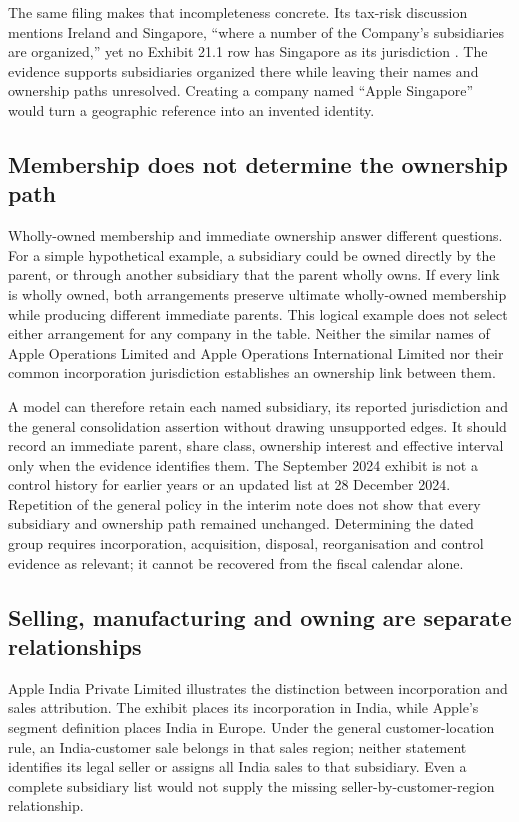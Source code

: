The same filing makes that incompleteness concrete. Its tax-risk discussion
mentions Ireland and Singapore, ``where a number of the Company's subsidiaries
are organized,'' yet no Exhibit 21.1 row has Singapore as its jurisdiction
\citep[Risk Factors, printed p.~16]{apple2024}. The evidence supports
subsidiaries organized there while leaving their names and ownership paths
unresolved. Creating a company named ``Apple Singapore'' would turn a
geographic reference into an invented identity.

\subsection{Membership does not determine the ownership path}

Wholly-owned membership and immediate ownership answer different questions.
For a simple hypothetical example, a subsidiary could be owned directly by
the parent, or through another subsidiary that the parent wholly owns. If
every link is wholly owned, both arrangements preserve ultimate wholly-owned
membership while producing different immediate parents. This logical example
does not select either arrangement for any company in the table. Neither the
similar names of Apple Operations Limited and Apple Operations International
Limited nor their common incorporation jurisdiction establishes an ownership
link between them.

A model can therefore retain each named subsidiary, its reported jurisdiction
and the general consolidation assertion without drawing unsupported edges.
It should record an immediate parent, share class, ownership interest and
effective interval only when the evidence identifies them. The September 2024
exhibit is not a control history for earlier years or an updated list at
28 December 2024. Repetition of the general policy in the interim note does
not show that every subsidiary and ownership path remained unchanged.
Determining the dated group requires incorporation, acquisition, disposal,
reorganisation and control evidence as relevant; it cannot be recovered from
the fiscal calendar alone.

\subsection{Selling, manufacturing and owning are separate relationships}

Apple India Private Limited illustrates the distinction between incorporation
and sales attribution. The exhibit places its incorporation in India, while
Apple's segment definition places India in Europe. Under the general
customer-location rule, an India-customer sale belongs in that sales region;
neither statement identifies its legal seller or assigns all India sales to
that subsidiary. Even a complete subsidiary list would not supply the missing
seller-by-customer-region relationship.

